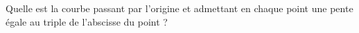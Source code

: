 \begin{exercice}\label{exoEquaDiff0015}

Quelle est la courbe passant par l'origine et admettant en chaque point une pente égale au triple de l'abscisse du point ?

\end{exercice}
